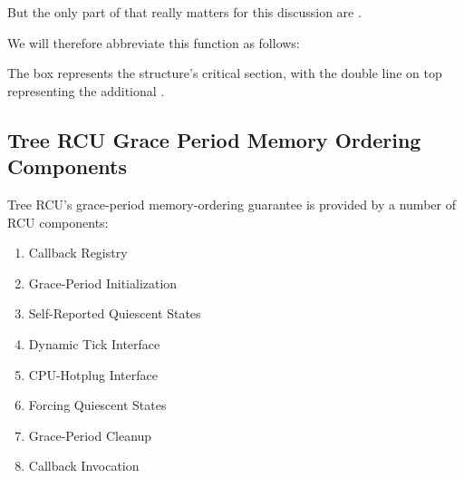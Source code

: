 \begin{fcvref}
But the only part of  that really matters for
this discussion are . %
\end{fcvref}
We will therefore abbreviate this
function as follows:

\begin{center}
\end{center}

The box represents the  structure's  critical
section, with the double line on top representing the additional
.

\subsection{Tree RCU Grace Period Memory Ordering Components}

Tree RCU's grace-period memory-ordering guarantee is provided by a
number of RCU components:

\begin{enumerate}
\item Callback Registry
\item Grace-Period Initialization
\item Self-Reported Quiescent States
\item Dynamic Tick Interface
\item CPU-Hotplug Interface
\item Forcing Quiescent States
\item Grace-Period Cleanup
\item Callback Invocation
\end{enumerate}

